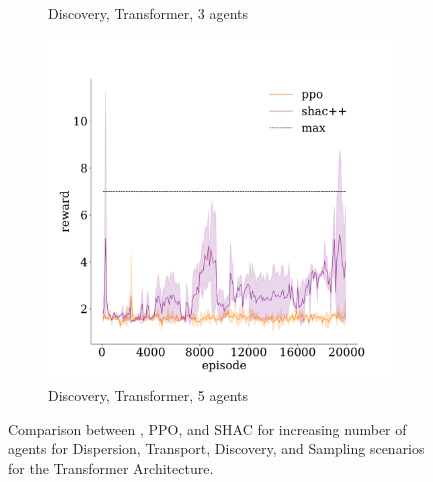 \begin{figure}[!t]
\begin{subfigure}[b]{0.32\textwidth}
        \caption{Discovery, Transformer, 3 agents}
        \label{fig:discovery-transformer-3}
    \end{subfigure}
    \begin{subfigure}[b]{0.32\textwidth}
        \includegraphics[width=\textwidth]{figs/discovery-5-transformer.pdf}
        \caption{Discovery, Transformer, 5 agents}
        \label{fig:discovery-transformer-5}
    \end{subfigure}

    \caption{Comparison between \fname{}, PPO, and SHAC for increasing number of agents for Dispersion, Transport, Discovery, and Sampling scenarios for the Transformer Architecture.}
    \label{fig:experiments}
\end{figure}

